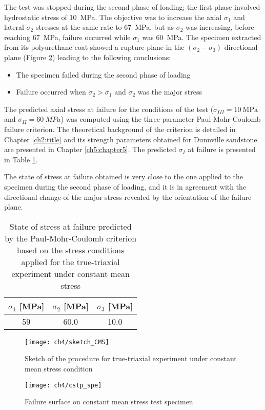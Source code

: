 The test was stopped during the second phase of loading; the first phase involved hydrostatic stress of \SI{10}{MPa}. The objective was to increase the axial $\sigma_1$ and lateral $\sigma_2$ stresses at the same rate to \SI{67}{MPa}, but as $\sigma_2$  was increasing, before reaching \SI{67}{MPa}, failure occurred while $\sigma_1$ was \SI{60}{MPa}. The specimen extracted from its polyurethane coat showed a rupture plane in the $(\sigma_{2}-\sigma_{3})$ directional plane (Figure \ref{fig4:ctsp_spe}) leading to the following conclusions:
\begin{itemize}
    \item The specimen failed during the second phase of loading
    \item Failure occurred when $\sigma_2>\sigma_1$ and $\sigma_{2}$ was the major stress
\end{itemize}
The predicted axial stress at failure for the conditions of the test ($\sigma_{III}=\SI{10}{\mega\pascal}$ and $\sigma_{II}=\SI{60}{MPa}$) was computed using the three-parameter Paul-Mohr-Coulomb failure criterion. The theoretical background of the criterion is detailed in Chapter \ref{ch2:title} and its strength parameters obtained for Dunnville sandstone are presented in Chapter \ref{ch5:chapter5}. The predicted $\sigma_I$ at failure is presented in Table \ref{tb4:TT3_sol}.

The state of stress at failure obtained is very close to the one applied to the specimen during the second phase of loading, and  it is in agreement with the directional change of the major stress revealed by the orientation of the failure plane.

\begin{table}[b!]
    \centering
    \captionsetup{justification=centering}
    \caption{State of stress at failure predicted by the Paul-Mohr-Coulomb criterion based on the stress conditions applied for the true-triaxial experiment under constant mean stress}
    \begin{tabular}{ccc}
        \hline
        $\sigma_1$ [\si{MPa}] & $\sigma_2$ [\si{MPa}] & $\sigma_3$ [\si{MPa}] \\
        \hline
        \hline
        59 & 60.0 & 10.0 \\
        \hline
    \end{tabular}
    \label{tb4:TT3_sol}
\end{table}

\begin{figure}[b!]
    \centering
    \texttt{[image: ch4/sketch\_CMS]}
    \captionsetup{justification=centering}
    \caption{Sketch of the procedure for true-triaxial experiment under constant mean stress condition}
    \label{fig4:16}
\end{figure} 

\begin{figure}[b!]
    \centering
    \texttt{[image: ch4/cstp\_spe]}
    \captionsetup{justification=centering}
    \caption{Failure surface on constant mean stress test specimen}
    \label{fig4:ctsp_spe}
\end{figure}